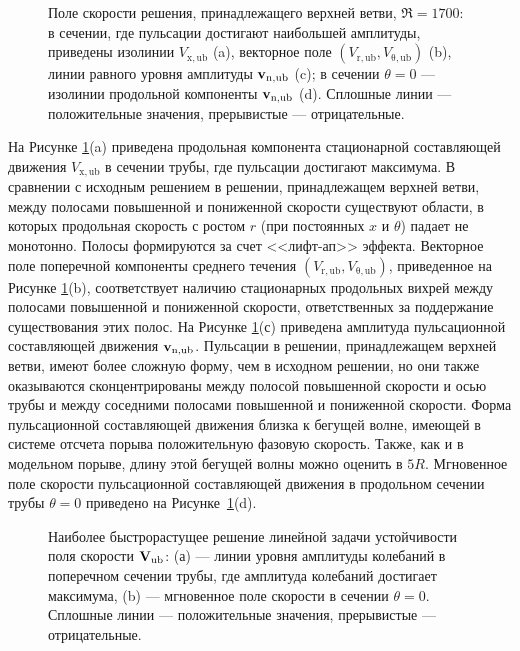 \begin{figure}
\caption{Поле скорости решения, принадлежащего верхней ветви, $\Re = 1700$: в сечении, где пульсации достигают наибольшей амплитуды, приведены изолинии $V_\mathrm{x,ub}$ (a), векторное поле $(V_\mathrm{r,ub}, V_\mathrm{\theta,ub})$ (b), линии равного уровня амплитуды $\mathbf{v}_\mathrm{n,ub}$ (c); в сечении $\theta = 0$ --- изолинии продольной компоненты $\mathbf{v}_\mathrm{n,ub}$ (d). Сплошные линии --- положительные значения, прерывистые --- отрицательные.}
\label{local_ub_means_pic}
\end{figure}

На Рисунке \ref{local_ub_means_pic}(a) приведена продольная компонента стационарной составляющей движения $V_\mathrm{x,ub}$ в сечении трубы, где пульсации достигают максимума. В сравнении с исходным решением в решении, принадлежащем верхней ветви, между полосами повышенной и пониженной скорости существуют области, в которых продольная скорость с ростом $r$ (при постоянных $x$ и $\theta$) падает не монотонно. Полосы формируются за счет <<лифт-ап>> эффекта. Векторное поле поперечной компоненты среднего течения $(V_\mathrm{r,ub}, V_\mathrm{\theta,ub})$, приведенное на Рисунке \ref{local_ub_means_pic}(b), соответствует наличию стационарных продольных вихрей между полосами повышенной и пониженной скорости, ответственных за поддержание существования этих полос. На Рисунке \ref{local_ub_means_pic}(с) приведена амплитуда пульсационной составляющей движения $\mathbf{v}_\mathrm{n,ub}$. Пульсации в решении, принадлежащем верхней ветви, имеют более сложную форму, чем в исходном решении, но они также оказываются сконцентрированы между полосой повышенной скорости и осью трубы и между соседними полосами повышенной и пониженной скорости. Форма пульсационной составляющей движения близка к бегущей волне, имеющей в системе отсчета порыва положительную фазовую скорость. Также, как и в модельном порыве, длину этой бегущей волны можно оценить в $5R$. Мгновенное поле скорости пульсационной составляющей движения в продольном сечении трубы $\theta = 0$ приведено на Рисунке~\ref{local_ub_means_pic}(d).  


\begin{figure}
\caption{Наиболее быстрорастущее решение линейной задачи устойчивости поля скорости $\mathbf{V}_\mathrm{ub}$:  (а) --- линии уровня амплитуды колебаний в поперечном сечении трубы, где амплитуда колебаний достигает максимума, (b) --- мгновенное поле скорости в сечении $\theta = 0$. Сплошные линии --- положительные значения, прерывистые --- отрицательные.}
\label{ub_lin_pic}
\end{figure}

